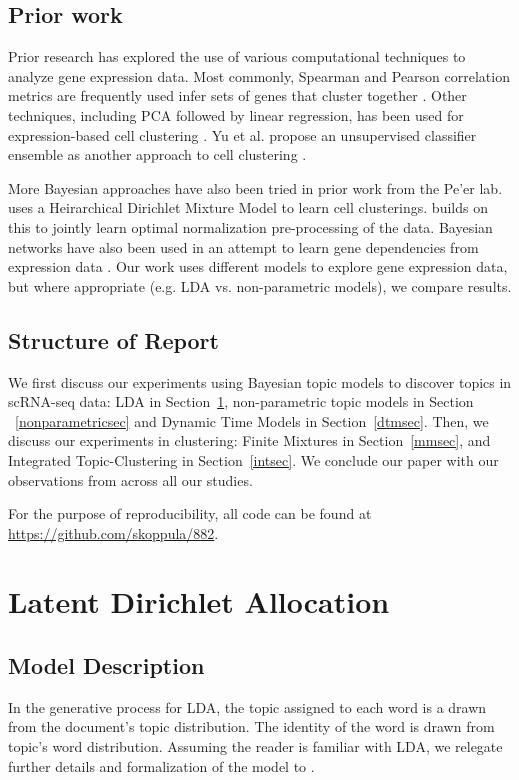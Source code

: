 \documentclass{article}
\begin{document}
\subsection{Prior work}
Prior research has explored the use of various computational techniques to analyze gene expression data. Most commonly, Spearman and Pearson correlation metrics are frequently used infer sets of genes that cluster together \cite{profiling, nature}. Other techniques, including PCA followed by linear regression, has been used for expression-based cell clustering \cite{transcriptomics}. Yu et al. propose an unsupervised classifier ensemble as another approach to cell clustering \cite{consensus}. 

More Bayesian approaches have also been tried in prior work from the Pe'er lab. \cite{bayesge2} uses a Heirarchical Dirichlet Mixture Model to learn cell clusterings. \cite{bayesge1} builds on this to jointly learn optimal normalization pre-processing of the data. Bayesian networks have also been used in an attempt to learn gene dependencies from expression data \cite{bayesge3}. Our work uses different models to explore gene expression data, but where appropriate (e.g. LDA vs. non-parametric models), we compare results.

\subsection{Structure of Report}
We first discuss our experiments using Bayesian topic models to discover topics in scRNA-seq data: LDA in Section~\ref{ldasec}, non-parametric topic models in Section ~\ref{nonparametricsec} and Dynamic Time Models in Section~\ref{dtmsec}. Then, we discuss our experiments in clustering: Finite Mixtures in Section~\ref{mmsec}, and Integrated Topic-Clustering in Section~\ref{intsec}. We conclude our paper with our observations from across all our studies.

For the purpose of reproducibility, all code can be found at \url{https://github.com/skoppula/882}.

\section{Latent Dirichlet Allocation} 
\label{ldasec}
\subsection{Model Description} 
In the generative process for LDA, the topic assigned to each word is a drawn from the document's topic distribution. The identity of the word is drawn from topic's word distribution. Assuming the reader is familiar with LDA, we relegate further details and formalization of the model to \cite{LDA}.
\end{document}
